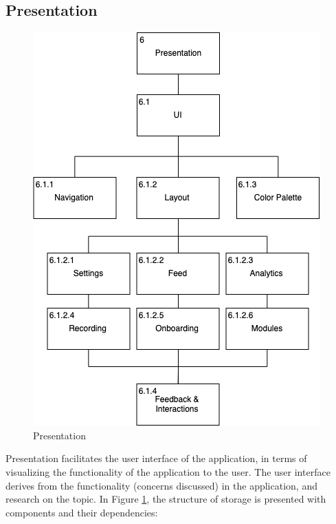 \subsection{Presentation}\label{soc:presentation}
\begin{figure}
    \centering
    \includegraphics[scale=0.5]{images/Presentation.png}
    \caption{Presentation}
    \label{fig:hta_presentation}
\end{figure}

Presentation facilitates the user interface of the application, in terms of visualizing the functionality of the application to the user. The user interface derives from the functionality (concerns discussed) in the application, and research on the topic. In Figure \ref{fig:hta_presentation}, the structure of storage is presented with components and their dependencies: 

